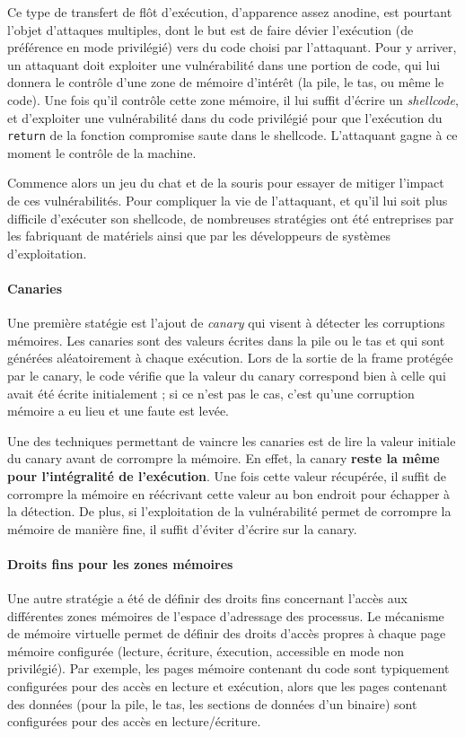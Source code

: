 Ce type de transfert de flôt d'exécution, d'apparence assez anodine, est pourtant l'objet d'attaques multiples, dont le but est de faire dévier l'exécution (de préférence en mode privilégié) vers du code choisi par l'attaquant. Pour y arriver, un attaquant doit exploiter une vulnérabilité dans une portion de code, qui lui donnera le contrôle d'une zone de mémoire d'intérêt (la pile, le tas, ou même le code). Une fois qu'il contrôle cette zone mémoire, il lui suffit d'écrire un \emph{shellcode}, et d'exploiter une vulnérabilité dans du code privilégié pour que l'exécution du \texttt{return} de la fonction compromise saute dans le shellcode. L'attaquant gagne à ce moment le contrôle de la machine.

Commence alors un jeu du chat et de la souris pour essayer de mitiger l'impact de ces vulnérabilités. Pour compliquer la vie de l'attaquant, et qu'il lui soit plus difficile d'exécuter son shellcode, de nombreuses stratégies ont été entreprises par les fabriquant de matériels ainsi que par les développeurs de systèmes d'exploitation. 

\paragraph{Canaries}
Une première statégie est l'ajout de \emph{canary} qui visent à détecter les corruptions mémoires. Les canaries sont des valeurs écrites dans la pile ou le tas et qui sont générées aléatoirement à chaque exécution. Lors de la sortie de la frame protégée par le canary, le code vérifie que la valeur du canary correspond bien à celle qui avait été écrite initialement ; si ce n'est pas le cas, c'est qu'une corruption mémoire a eu lieu et une faute est levée.

Une des techniques permettant de vaincre les canaries est de lire la valeur initiale du canary avant de corrompre la mémoire. En effet, la canary \textbf{reste la même pour l'intégralité de l'exécution}. Une fois cette valeur récupérée, il suffit de corrompre la mémoire en réécrivant cette valeur au bon endroit pour échapper à la détection. De plus, si l'exploitation de la vulnérabilité permet de corrompre la mémoire de manière fine, il suffit d'éviter d'écrire sur la canary.

\paragraph{Droits fins pour les zones mémoires}
\label{memory_rights}
Une autre stratégie a été de définir des droits fins concernant l'accès aux différentes zones mémoires de l'espace d'adressage des processus. Le mécanisme de mémoire virtuelle permet de définir des droits d'accès propres à chaque page mémoire configurée (lecture, écriture, éxecution, accessible en mode non privilégié). Par exemple, les pages mémoire contenant du code sont typiquement configurées pour des accès en lecture et exécution, alors que les pages contenant des données (pour la pile, le tas, les sections de données d'un binaire) sont configurées pour des accès en lecture/écriture.

